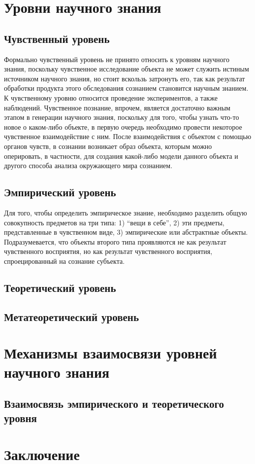 \documentclass[14pt]{article}
\begin{document}
 \section{Уровни научного знания}
 \subsection{Чувственный уровень}
Формально чувственный уровень не принято относить к уровням научного знания, поскольку чувственное исследование объекта не может служить истиным источником научного знания, но стоит вскользь затронуть его, так как результат обработки продукта этого обследования сознанием становится научным знанием. К чувственному уровню относится проведение экспериментов, а также наблюдений. Чувственное познание, впрочем, является достаточно важным этапом в генерации научного знания, поскольку для того, чтобы узнать что-то новое о каком-либо объекте, в первую очередь необходимо провести некоторое чувственное взаимодействие с ним. После взаимодействия с объектом с помощью органов чувств, в сознании возникает образ объекта, которым можно оперировать, в частности, для создания какой-либо модели данного объекта и другого способа анализа окружающего мира сознанием.
\subsection{Эмпирический уровень}
Для того, чтобы определить эмпирическое знание, необходимо разделить общую совокупность предметов на три типа: 1) ``вещи в себе'', 2) эти предметы, представленные в чувственном виде, 3) эмпирические или абстрактные объекты. Подразумевается, что объекты второго типа проявляются не как результат чувственного восприятия, но как результат чувственного восприятия, спроецированный на сознание субъекта. 
\subsection{Теоретический уровень}
\subsection{Метатеоретический уровень}
\section{Механизмы взаимосвязи уровней научного знания}
\subsection{Взаимосвязь эмпирического и теоретического уровня}
\section{Заключение}
\end{document}
